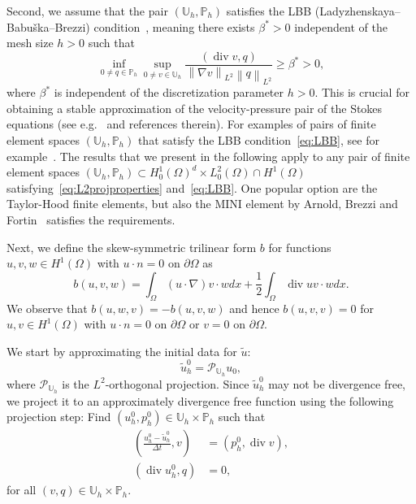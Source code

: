 \documentclass[10pt,letterpaper]{amsart}
\newcommand{\tu}{\widetilde{u}}
\newcommand\norm[1]{\left\lVert#1\right\rVert}
\newcommand{\Grad}{\nabla}
\newcommand{\Div}{\operatorname{div}}
\newcommand{\dom}{\Omega}
\newcommand{\Ph}{\mathbb{P}_h}
\newcommand{\Uh}{\mathbb{U}_h}
\newcommand{\PUh}{\mathcal{P}_{\Uh}}
\theoremstyle{definition}{\newtheorem{definition}[lemma]{Definition}}
\numberwithin{equation}{section}
\begin{document}
Second, we assume that the pair $(\Uh,\Ph)$ satisfies the LBB (Ladyzhenskaya–Babu\v{s}ka–Brezzi) condition~\cite{Boffi2013}, meaning there exists $\beta^*>0$ independent of the mesh size $h>0$ such that  
\begin{equation}\label{eq:LBB}
\inf_{0\neq q\in \Ph}\sup_{0\neq v\in \Uh}\frac{(\Div v,q)}{\norm{\Grad v}_{L^2}\norm{q}_{L^2}}\geq \beta^*>0,
\end{equation}
where $\beta^*$ is independent of the discretization parameter $h>0$.
This is crucial for obtaining a stable approximation of the velocity-pressure pair of the Stokes equations (see e.g.~\cite{Boffi2013,Boyer2013,Guermond1998} and references therein).  For examples of pairs of finite element spaces $(\Uh,\Ph)$ that satisfy the LBB condition~\eqref{eq:LBB}, see for example~\cite{Girault1986,Ern2004}. The results that we present in the following apply to any pair of finite element spaces $(\Uh,\Ph)\subset H^1_0(\dom)^d\times L^2_0(\dom)\cap H^1(\dom)$ satisfying~\eqref{eq:L2projproperties} and~\eqref{eq:LBB}. One popular option are the Taylor-Hood finite elements, but also the MINI element by Arnold, Brezzi and Fortin~\cite{Arnold1984} satisfies the requirements. 

Next, we define the skew-symmetric trilinear form $b$ for functions $u,v,w\in H^1(\dom)$ with $u\cdot n=0$ on $\partial\dom$ as
\begin{equation}
\label{eq:defb}
b(u,v,w) = \int_{\dom} (u\cdot\Grad) v \cdot w dx +\frac12 \int_{\dom} \Div u v\cdot w dx.
\end{equation}
We observe that $b(u,w,v)= - b(u,v,w)$ and hence $b(u,v,v)=0$ for $u,v\in H^1(\dom)$ with $u\cdot n =0$ on $\partial\dom$ or $v=0$ on $\partial\dom$.  
  
 We start by approximating the initial data for $\tu$:
\begin{equation}
\label{eq:initdataapprox}
\tu^0_h = \PUh u_0, 
\end{equation} 
where $\PUh$ is the $L^2$-orthogonal projection.
Since $\tu_h^0$ may not be divergence free, we project it to an approximately divergence free function using the following projection step: Find $(u_h^0,p_h^0)\in \Uh\times\Ph$ such that
\begin{align*}
\left(\frac{u^{0}_h-\tu^{0}_h}{\Delta t }, v\right)&= (p^{0}_h,\Div v),\\
\left(\Div u^{0}_h,q\right)&=0,	
\end{align*}
for all $(v,q)\in \Uh\times \Ph$.
\end{document}
